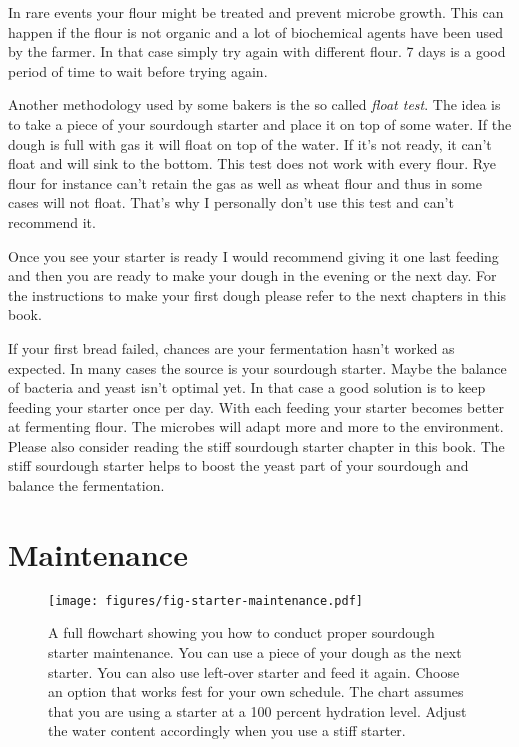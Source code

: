 In rare events your flour might be treated and prevent microbe growth.
This can happen if the flour is not organic and a lot of biochemical
agents have been used by the farmer. In that case simply try again
with different flour. 7 days is a good period of time to wait before
trying again.

Another methodology used by some bakers is the so called \emph{float test}.
The idea is to take a piece of your sourdough starter and place it
on top of some water. If the dough is full with gas it will float
on top of the water. If it's not ready, it can't float and will
sink to the bottom. This test does not work with every flour.
Rye flour for instance can't retain the gas as well as wheat flour
and thus in some cases will not float. That's why I personally
don't use this test and can't recommend it.

Once you see your starter is ready I would recommend giving it
one last feeding and then you are ready to make your dough in the
evening or the next day. For the instructions to make your
first dough please refer to the next chapters in this book.

If your first bread failed, chances are your fermentation hasn't
worked as expected. In many cases the source is your sourdough starter. Maybe
the balance of bacteria and yeast isn't optimal yet. In that case a good
solution is to keep feeding your starter once per day. With each feeding your
starter becomes better at fermenting flour. The microbes will adapt more and
more to the environment. Please also consider reading the stiff sourdough starter
chapter in this book. The stiff sourdough starter helps to boost the
yeast part of your sourdough and balance the fermentation.

\section{Maintenance}

\begin{figure}[!htb]
  \texttt{[image: figures/fig-starter-maintenance.pdf]}
  \caption{A full flowchart showing you how to conduct proper sourdough starter maintenance. You can use a
  piece of your dough as the next starter. You can also use left-over starter and feed it again. Choose an
  option that works fest for your own schedule. The chart assumes that you are using a starter at a 100 percent
  hydration level. Adjust the water content accordingly when you use a stiff starter.}
  \label{fig:sourdough-maintenance-process}
\end{figure}

